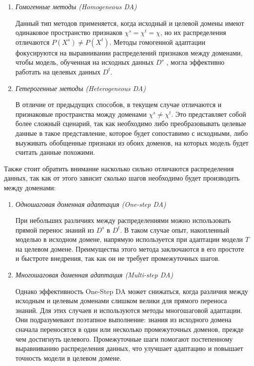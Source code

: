 \begin{enumerate}
\item \textit{Гомогенные методы (Homogeneous DA)}

Данный тип методов применяется, когда исходный и целевой домены имеют одинаковое пространство признаков $\chi^s = \chi^t = \chi$, но их распределения отличаются $P(X^s) \ne P(X^t)$. Методы гомогенной адаптации фокусируются на выравнивании распределений признаков между доменами, чтобы модель, обученная на исходных данных $D^s$ , могла эффективно работать на целевых данных $D^t$.

\item \textit{Гетерогенные методы (Heterogeneous DA)}

В отличие от предыдущих способов, в текущем случае отличаются и признаковые пространства можду доменами $\chi^s \ne \chi^t$. Это представляет собой более сложный сценарий, так как необходимо либо преобразовывать целевые данные в такое представление, которое будет сопоставимо с исходными, либо выуживать обобщенные признаки из обоих доменов, на которых модель будет считать данные похожими.

\end{enumerate}

\hfill \break
Также стоит обратить внимание насколько сильно отличаются распределения данных, так как от этого зависит сколько шагов необходимо будет производить между доменами:

\begin{enumerate}
\item \textit{Одношаговая доменная адаптация (One-step DA)}

При небольших различиях между распределениями можно использовать прямой перенос знаний из $D^s$ в $D^t$. В таком случае опыт, накопленный моделью в исходном домене, напрямую используется при адаптации модели $T$ на целевом домене. Преимущества этого метода заключаются в его простоте и быстроте внедрения, так как он не требует промежуточных шагов.

\item \textit{Многошаговая доменная адаптация (Multi-step DA)}

Однако эффективность One-Step DA может снижаться, когда различия между исходным и целевым доменами слишком велики для прямого переноса знаний. Для этих случаев и используются методы многошаговой адаптации. Они подразумевают поэтапное выполнение: знания из исходного домена сначала переносятся в один или несколько промежуточных доменов, прежде чем достигнуть целевого. Промежуточные шаги помогают постепенному выравниванию распределения данных, что улучшает адаптацию и повышает точность модели в целевом домене.

\end{enumerate}

